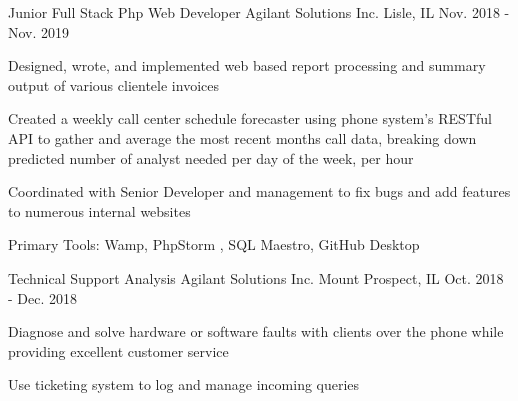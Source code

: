 


\begin{cventries}



\cventry
{Junior Full Stack Php Web Developer} %
{Agilant Solutions Inc.} %
{Lisle, IL} %
{Nov. 2018 - Nov. 2019} %
{ %
\begin{cvitems}
\item {Designed, wrote, and implemented web based report processing and summary output of various clientele invoices}
\item {Created a weekly call center schedule forecaster using phone system's RESTful API to gather and average the most recent months call data, breaking down predicted number of analyst needed per day of the week, per hour}
\item {Coordinated with Senior Developer and management to fix bugs and add features to numerous internal websites}
\item {Primary Tools: Wamp, PhpStorm , SQL Maestro, GitHub Desktop}
\end{cvitems}
}

\cventry
{Technical Support Analysis} %
{Agilant Solutions Inc.} %
{Mount Prospect, IL} %
{Oct. 2018 - Dec. 2018} %
{ %
\begin{cvitems}
\item {Diagnose and solve hardware or software faults with clients over the phone while providing excellent customer service}
\item {Use ticketing system to log and manage incoming queries}
\end{cvitems}
}



\end{cventries}